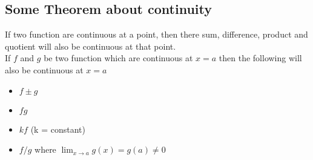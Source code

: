\documentclass[10pt,a4paper]{article}
\begin{document}
\subsection{Some Theorem about continuity} If two function are continuous at a point, then there sum, difference, product and quotient will also be continuous at that point. \\ If $f$ and $g$ be two function which are continuous at $x=a$ then the following will also be continuous at $x=a$
\begin{itemize}
\item $f \pm g$ 
\item $ f g$
\item $k f$ (k = constant) 
\item $f/g$ where $\lim_{x \to a} g(x) = g(a) \neq 0$
\end{itemize} 
\end{document}
